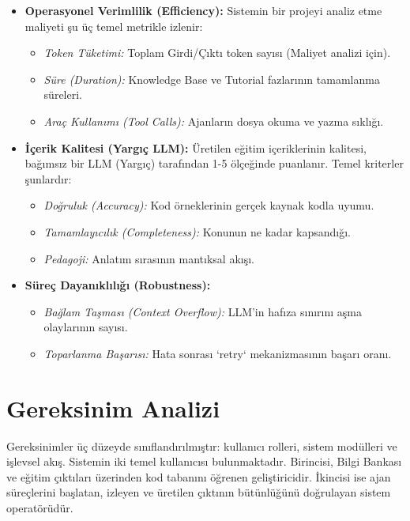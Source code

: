 \begin{itemize}
    \item \textbf{Operasyonel Verimlilik (Efficiency):} Sistemin bir projeyi analiz etme maliyeti şu üç temel metrikle izlenir:
    \begin{itemize}
        \item \textit{Token Tüketimi:} Toplam Girdi/Çıktı token sayısı (Maliyet analizi için).
        \item \textit{Süre (Duration):} Knowledge Base ve Tutorial fazlarının tamamlanma süreleri.
        \item \textit{Araç Kullanımı (Tool Calls):} Ajanların dosya okuma ve yazma sıklığı.
    \end{itemize}

    \item \textbf{İçerik Kalitesi (Yargıç LLM):} Üretilen eğitim içeriklerinin kalitesi, bağımsız bir LLM (Yargıç) tarafından 1-5 ölçeğinde puanlanır. Temel kriterler şunlardır:
    \begin{itemize}
        \item \textit{Doğruluk (Accuracy):} Kod örneklerinin gerçek kaynak kodla uyumu.
        \item \textit{Tamamlayıcılık (Completeness):} Konunun ne kadar kapsandığı.
        \item \textit{Pedagoji:} Anlatım sırasının mantıksal akışı.
    \end{itemize}

    \item \textbf{Süreç Dayanıklılığı (Robustness):}
    \begin{itemize}
        \item \textit{Bağlam Taşması (Context Overflow):} LLM'in hafıza sınırını aşma olaylarının sayısı.
        \item \textit{Toparlanma Başarısı:} Hata sonrası `retry` mekanizmasının başarı oranı.
    \end{itemize}
\end{itemize}


\section{Gereksinim Analizi}
\label{sec:gereksinim-analizi}

Gereksinimler üç düzeyde sınıflandırılmıştır: kullanıcı rolleri, sistem modülleri ve işlevsel akış. Sistemin iki temel kullanıcısı bulunmaktadır. Birincisi, Bilgi Bankası ve eğitim çıktıları üzerinden kod tabanını öğrenen geliştiricidir. İkincisi ise ajan süreçlerini başlatan, izleyen ve üretilen çıktının bütünlüğünü doğrulayan sistem operatörüdür. 

